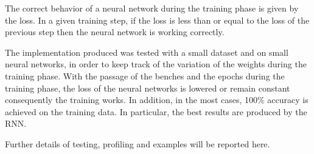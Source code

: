 The correct behavior of a neural network during the training phase is given by the loss. In a given training step, if the loss is less than or equal to the loss of the previous step then the neural network is working correctly.

The implementation produced was tested with a small dataset and on small neural networks, in order to keep track of the variation of the weights during the training phase. With the passage of the benches and the epochs during the training phase, the loss of the neural networks is lowered or remain constant consequently the training works. In addition, in the most cases, 100\% accuracy is achieved on the training data. In particular, the best results are produced by the RNN.

Further details of testing, profiling and examples will be reported here.